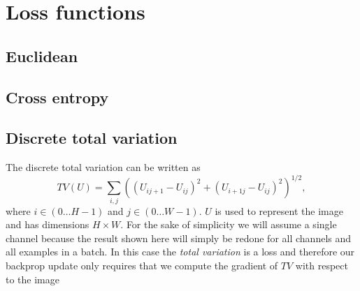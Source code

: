 \documentclass[a4paper]{article}
\begin{document}
\newpage
\section{Loss functions}
\subsection{Euclidean}
\subsection{Cross entropy}
\subsection{Discrete total variation}

The discrete total variation can be written as 
\begin{equation}
TV(U)= \sum_{i,j} \left ( \left ( U_{ij+1}-U_{ij}\right )^2 + \left ( U_{i+1j}-U_{ij}\right )^2 \right )^{1/2},
\end{equation}
where $i \in (0\dots H-1)$ and $j \in (0\dots W-1)$. $U$ is used to represent the image and has dimensions $H \times W$. For the sake of simplicity we will assume a single channel because the result shown here will simply be redone for all channels and all examples in a batch. In this case the {\it total variation} is a loss and therefore our backprop update only requires that we compute the gradient of $TV$ with respect to the image
\end{document}
